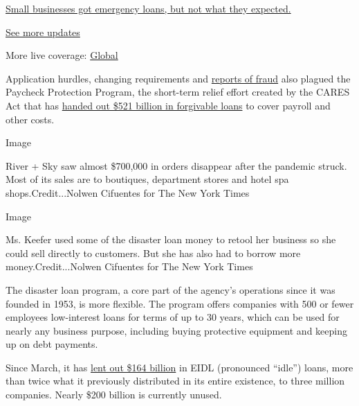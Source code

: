 \href{https://www.nytimes.com/live/2020/08/03/business/stock-market-today-coronavirus?action=click\&pgtype=Article\&state=default\&region=MAIN_CONTENT_1\&context=storylines_live_updates\#small-businesses-got-emergency-loans-but-not-what-they-expected}{Small
businesses got emergency loans, but not what they expected.}

\href{https://www.nytimes.com/live/2020/08/03/business/stock-market-today-coronavirus?action=click\&pgtype=Article\&state=default\&region=MAIN_CONTENT_1\&context=storylines_live_updates}{See
more updates}

More live coverage:
\href{https://www.nytimes.com/2020/08/03/world/coronavirus-covid-19.html?action=click\&pgtype=Article\&state=default\&region=MAIN_CONTENT_1\&context=storylines_live_updates}{Global}

Application hurdles, changing requirements and
\href{https://www.nytimes.com/2020/07/27/us/lamborghini-ppp-covid-19.html}{reports
of fraud} also plagued the Paycheck Protection Program, the short-term
relief effort created by the CARES Act that has
\href{https://www.nytimes.com/2020/06/30/business/paycheck-protection-program-coronavirus.html}{handed
out \$521 billion in forgivable loans} to cover payroll and other costs.

Image

River + Sky saw almost \$700,000 in orders disappear after the pandemic
struck. Most of its sales are to boutiques, department stores and hotel
spa shops.Credit...Nolwen Cifuentes for The New York Times

Image

Ms. Keefer used some of the disaster loan money to retool her business
so she could sell directly to customers. But she has also had to borrow
more money.Credit...Nolwen Cifuentes for The New York Times

The disaster loan program, a core part of the agency's operations since
it was founded in 1953, is more flexible. The program offers companies
with 500 or fewer employees low-interest loans for terms of up to 30
years, which can be used for nearly any business purpose, including
buying protective equipment and keeping up on debt payments.

Since March, it has
\href{https://www.sba.gov/sites/default/files/2020-07/EIDL\%20COVID-19\%20Loan\%207.27.20-508.pdf}{lent
out \$164 billion} in EIDL (pronounced ``idle'') loans, more than twice
what it previously distributed in its entire existence, to three million
companies. Nearly \$200 billion is currently unused.

